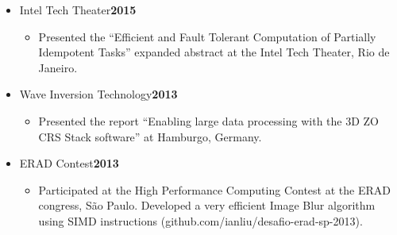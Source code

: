 \documentclass[10pt]{article}
\newenvironment{outerlist}[1][\enskip\textbullet]%
        {\begin{itemize}[#1,leftmargin=*]}{\end{itemize}%
         \vspace{-.6\baselineskip}}
\newenvironment{innerlist}[1][\enskip\textbullet]%
        {\begin{itemize}[#1,leftmargin=*,parsep=0pt,itemsep=0pt,topsep=0pt,partopsep=0pt]}
        {\end{itemize}}
\begin{document}
\begin{outerlist}

\item[] Intel Tech Theater\hfill {\bf 2015}
  \begin{innerlist}
  \item Presented the ``Efficient and Fault Tolerant Computation of Partially
  Idempotent Tasks'' expanded abstract at the Intel Tech Theater, Rio de Janeiro.
  \end{innerlist}


\item[] Wave Inversion Technology\hfill {\bf 2013}
  \begin{innerlist}
  \item Presented the report ``Enabling large data processing with the 3D ZO CRS
  Stack software'' at Hamburgo, Germany.
  \end{innerlist}

\item[] ERAD Contest\hfill {\bf 2013}
  \begin{innerlist}
  \item Participated at the High Performance Computing Contest at the ERAD
  congress, São Paulo. Developed a very efficient Image Blur algorithm using
  SIMD instructions (github.com/ianliu/desafio-erad-sp-2013).
  \end{innerlist}




\end{outerlist}
\end{document}
